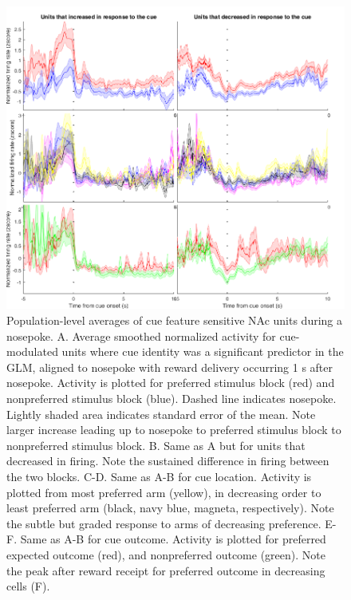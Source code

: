 \documentclass[11pt]{article}
\begin{document}
\begin{figure}[h]
\centering
\includegraphics[width=\textwidth]{Fig 10 - NP population averages.png}
\caption{Population-level averages of cue feature sensitive NAc units during a nosepoke. A. Average smoothed normalized activity for cue-modulated units where cue identity was a significant predictor in the GLM, aligned to nosepoke with reward delivery occurring 1 s after nosepoke. Activity is plotted for preferred stimulus block (red) and nonpreferred stimulus block (blue). Dashed line indicates nosepoke. Lightly shaded area indicates standard error of the mean. Note larger increase leading up to nosepoke to preferred stimulus block to nonpreferred stimulus block. B. Same as A but for units that decreased in firing. Note the sustained difference in firing between the two blocks. C-D. Same as A-B for cue location. Activity is plotted from most preferred arm (yellow), in decreasing order to least preferred arm (black, navy blue, magneta, respectively). Note the subtle but graded response to arms of decreasing preference. E-F. Same as A-B for cue outcome. Activity is plotted for preferred expected outcome (red), and nonpreferred outcome (green). Note the peak after reward receipt for preferred outcome in decreasing cells (F).}
\label{fig:NP_pop}
\end{figure}
\end{document}
